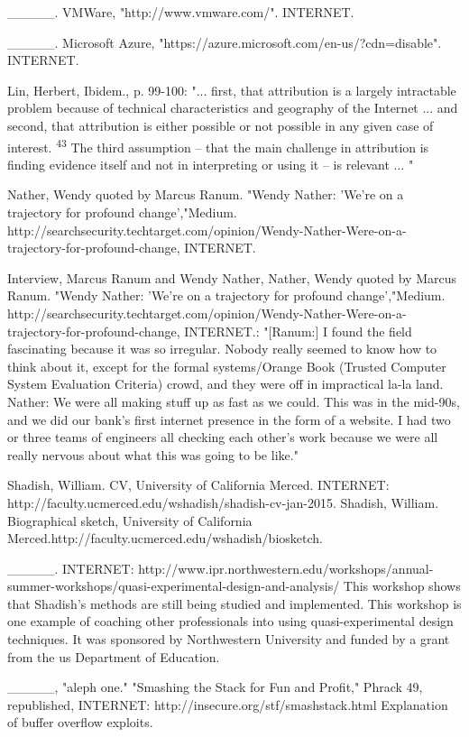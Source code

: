 \_\_\_\_\_. VMWare, "http://www.vmware.com/". INTERNET.

\_\_\_\_\_. Microsoft Azure, "https://azure.microsoft.com/en-us/?cdn=disable". INTERNET.

Lin, Herbert, Ibidem., p. 99-100: "... first, that attribution is a largely intractable problem because of technical characteristics and geography of the Internet ... and second, that attribution is either possible or not possible in any given case of interest. \textsuperscript{43} The third assumption -- that the main challenge in attribution is finding evidence itself and not in interpreting or using it -- is relevant ... "

Nather, Wendy quoted by Marcus Ranum. "Wendy Nather: 'We're on a trajectory for profound change',"Medium. http://searchsecurity.techtarget.com/opinion/Wendy-Nather-Were-on-a-trajectory-for-profound-change, INTERNET.

Interview, Marcus Ranum and Wendy Nather, Nather, Wendy quoted by Marcus Ranum. "Wendy Nather: 'We're on a trajectory for profound change',"Medium. http://searchsecurity.techtarget.com/opinion/Wendy-Nather-Were-on-a-trajectory-for-profound-change, INTERNET.: "[Ranum:] I found the field fascinating because it was so irregular. Nobody really seemed to know how to think about it, except for the formal systems/Orange Book (Trusted Computer System Evaluation Criteria) crowd, and they were off in impractical la-la land. Nather: We were all making stuff up as fast as we could. This was in the mid-90s, and we did our bank's first internet presence in the form of a website. I had two or three teams of engineers all checking each other's work because we were all really nervous about what this was going to be like."

Shadish, William. CV, University of California Merced. INTERNET: http://faculty.ucmerced.edu/wshadish/shadish-cv-jan-2015. Shadish, William. Biographical sketch, University of California Merced.http://faculty.ucmerced.edu/wshadish/biosketch.

\_\_\_\_\_. INTERNET: http://www.ipr.northwestern.edu/workshops/annual-summer-workshops/quasi-experimental-design-and-analysis/ This workshop shows that Shadish's methods are still being studied and implemented. This workshop is one example of coaching other professionals into using quasi-experimental design techniques. It was sponsored by Northwestern University and funded by a grant from the \gls{us} Department of Education.

\_\_\_\_\_, "aleph one." "Smashing the Stack for Fun and Profit," Phrack 49, republished, INTERNET: http://insecure.org/stf/smashstack.html Explanation of buffer overflow exploits.

